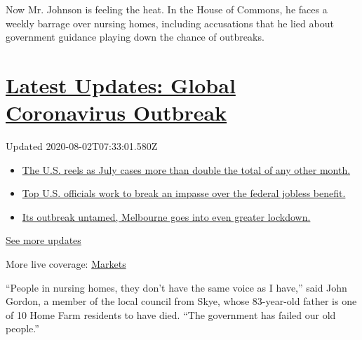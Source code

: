 Now Mr. Johnson is feeling the heat. In the House of Commons, he faces a
weekly barrage over nursing homes, including accusations that he lied
about government guidance playing down the chance of outbreaks.

\hypertarget{latest-updates-global-coronavirus-outbreak}{%
\section{\texorpdfstring{\href{https://www.nytimes.com/2020/08/01/world/coronavirus-covid-19.html?action=click\&pgtype=Article\&state=default\&region=MAIN_CONTENT_1\&context=storylines_live_updates}{Latest
Updates: Global Coronavirus
Outbreak}}{Latest Updates: Global Coronavirus Outbreak}}\label{latest-updates-global-coronavirus-outbreak}}

Updated 2020-08-02T07:33:01.580Z

\begin{itemize}
\tightlist
\item
  \href{https://www.nytimes.com/2020/08/01/world/coronavirus-covid-19.html?action=click\&pgtype=Article\&state=default\&region=MAIN_CONTENT_1\&context=storylines_live_updates\#link-34047410}{The
  U.S. reels as July cases more than double the total of any other
  month.}
\item
  \href{https://www.nytimes.com/2020/08/01/world/coronavirus-covid-19.html?action=click\&pgtype=Article\&state=default\&region=MAIN_CONTENT_1\&context=storylines_live_updates\#link-780ec966}{Top
  U.S. officials work to break an impasse over the federal jobless
  benefit.}
\item
  \href{https://www.nytimes.com/2020/08/01/world/coronavirus-covid-19.html?action=click\&pgtype=Article\&state=default\&region=MAIN_CONTENT_1\&context=storylines_live_updates\#link-2bc8948}{Its
  outbreak untamed, Melbourne goes into even greater lockdown.}
\end{itemize}

\href{https://www.nytimes.com/2020/08/01/world/coronavirus-covid-19.html?action=click\&pgtype=Article\&state=default\&region=MAIN_CONTENT_1\&context=storylines_live_updates}{See
more updates}

More live coverage:
\href{https://www.nytimes.com/live/2020/07/31/business/stock-market-today-coronavirus?action=click\&pgtype=Article\&state=default\&region=MAIN_CONTENT_1\&context=storylines_live_updates}{Markets}

``People in nursing homes, they don't have the same voice as I have,''
said John Gordon, a member of the local council from Skye, whose
83-year-old father is one of 10 Home Farm residents to have died. ``The
government has failed our old people.''

